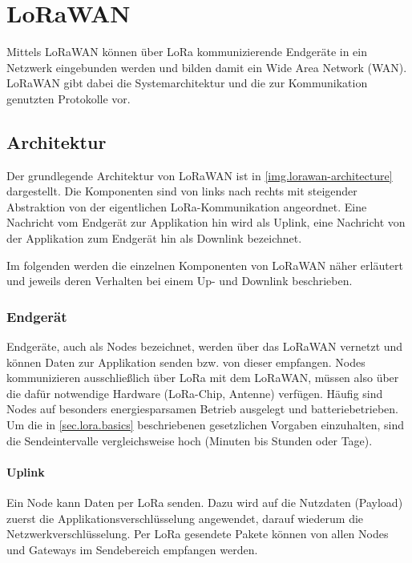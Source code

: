 \chapter{LoRaWAN}
Mittels \gls{LoRaWAN} können über LoRa kommunizierende Endgeräte in ein Netzwerk eingebunden werden und bilden damit ein Wide Area Network (WAN).
LoRaWAN gibt dabei die Systemarchitektur und die zur Kommunikation genutzten Protokolle vor.



\section{Architektur}
Der grundlegende Architektur von LoRaWAN ist in \autoref{img.lorawan-architecture} dargestellt.
Die Komponenten sind von links nach rechts mit steigender Abstraktion von der eigentlichen LoRa-Kommunikation angeordnet.
Eine Nachricht vom Endgerät zur Applikation hin wird als \gls{Uplink}, eine Nachricht von der Applikation zum Endgerät hin als \gls{Downlink} bezeichnet.
\cite{lorawanarchitecture}

Im folgenden werden die einzelnen Komponenten von LoRaWAN näher erläutert und jeweils deren Verhalten bei einem Up- und Downlink beschrieben.


\subsection{Endgerät}
Endgeräte, auch als \glspl{Node} bezeichnet, werden über das LoRaWAN vernetzt und können Daten zur Applikation senden bzw. von dieser empfangen.
Nodes kommunizieren ausschließlich über LoRa mit dem LoRaWAN, müssen also über die dafür notwendige Hardware (LoRa-Chip, Antenne) verfügen.
Häufig sind Nodes auf besonders energiesparsamen Betrieb ausgelegt und batteriebetrieben.
Um die in \autoref{sec.lora.basics} beschriebenen gesetzlichen Vorgaben einzuhalten, sind die Sendeintervalle vergleichsweise hoch (Minuten bis Stunden oder Tage).

\subsubsection{Uplink}
Ein Node kann Daten per LoRa senden.
Dazu wird auf die Nutzdaten (\gls{Payload}) zuerst die Applikationsverschlüsselung angewendet, darauf wiederum die Netzwerkverschlüsselung.
Per LoRa gesendete Pakete können von allen Nodes und Gateways im Sendebereich empfangen werden.

